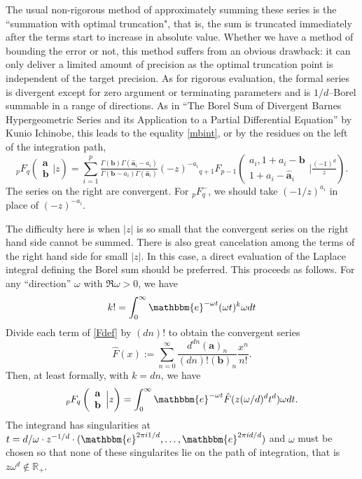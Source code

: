 \documentclass[12pt]{article}
\newcommand{\ee}[0] {\mathbbm{e}}
\numberwithin{equation}{section}
\newcommand{\Head}[3] {{}_{#1}{#2}_{#3}}
\newcommand{\ArgS}[3] {( \begin{smallmatrix} #1 \\ #2 \end{smallmatrix} | {#3})}
\newcommand{\FF}[6] {{}_{#1}{#2}_{#3} \left( \begin{array}{c} #4 \\ #5 \end{array} \Big| {#6}  \right)}
\begin{document}
The usual non-rigorous method of approximately summing these series is the ``summation with optimal truncation", that is, the sum is truncated immediately after the terms start to increase in absolute value. Whether we have a method of bounding the error or not, this method suffers from an obvious drawback: it can only deliver a limited amount of precision as the optimal truncation point is independent of the target precision. As for rigorous evaluation, the formal series is divergent except for zero argument or terminating parameters and is $1/d$--Borel summable in a range of directions. As in ``The Borel Sum of Divergent Barnes Hypergeometric Series and its Application to a Partial Differential Equation'' by Kunio Ichinobe, this leads to the equality \eqref{mbint}, or by the residues on the left of the integration path,
\begin{equation}
\label{divrecp}
\Head{p}{F}{q} \ArgS{\mathbf{a}}{\mathbf{b}}{z} = \sum_{i=1}^{p} \tfrac{\Gamma(\mathbf{b}) \Gamma(\hat{\mathbf{a}}_i-a_i)}{\Gamma(\mathbf{b}-a_i) \Gamma(\hat{\mathbf{a}}_i)} (-z)^{-a_i} \Head{q+1}{F}{p-1} \ArgS{a_i,1+a_i-\mathbf{b}}{1+a_i-\hat{\mathbf{a}}_i}{\tfrac{(-1)^d}{z}}\text{.}
\end{equation}
The series on the right are convergent. For ${}_p^{\,} F_{q}^{-}$, we should take $(-1/z)^{a_i}$ in place of $(-z)^{-a_i}$.

The difficulty here is when $|z|$ is so small that the convergent series on the right hand side cannot be summed. There is also great cancelation among the terms of the right hand side for small $|z|$. In this case, a direct evaluation of the Laplace integral defining the Borel sum should be preferred. This proceeds
as follows. For any ``direction'' $\omega$ with $\Re \omega > 0$, we have
\begin{equation*}
k! = \int_0^{\infty} \ee^{-\omega t} (\omega t)^k \omega dt
\end{equation*}
Divide each term of \eqref{Fdef} by $(dn)!$ to obtain the convergent series
\begin{equation*}
\hat{F}(x) := \sum_{n=0}^{\infty} \frac{d^{d n}(\mathbf{a})_n}{(dn)!(\mathbf{b})_n} \frac{x^n}{n!}\text{.}
\end{equation*}
Then, at least formally, with $k = dn$, we have
\begin{equation*}
\FF{p}{F}{q}{\mathbf{a}}{\mathbf{b}}{z} = \int_{0}^{\infty} \ee^{-\omega t} \hat{F}(z(\omega/d)^d t^d) \omega dt \text{.}
\end{equation*}
The integrand has singularities at $t = d/\omega \cdot z^{-1/d} \cdot (\ee^{2\pi i 1/ d}, \dots, \ee^{2\pi i  d / d})$
and $\omega$ must be chosen so that none of these singularites lie on the path of integration, that is $z \omega^d \not \in \mathbb{R}_{+}$.
\end{document}
